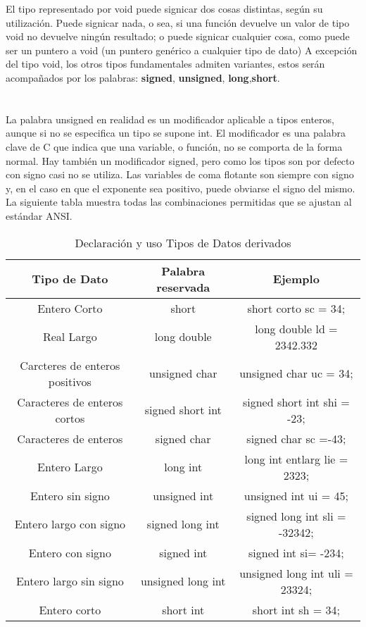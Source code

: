 \documentclass[a4paper]{article}
\begin{document}
El tipo representado por void puede signicar dos cosas distintas, según su utilización. Puede signicar nada, o sea, si una función devuelve un valor de tipo void no devuelve ningún resultado; o puede signicar cualquier cosa, como puede ser un puntero a void (un puntero genérico a cualquier tipo de dato) A excepción del tipo void, los otros tipos fundamentales admiten variantes, estos serán acompañados por los palabras: \textbf{signed}, \textbf{unsigned}, \textbf{long},\textbf{short}. \\
\\
\\
La palabra unsigned en realidad es un modificador aplicable a tipos enteros, aunque si no se especifica un tipo se supone int. El modificador es una palabra clave de C que indica que una variable, o función, no se comporta de la forma normal. Hay también un modificador signed, pero como los tipos son por defecto con signo casi no se utiliza. Las variables de coma flotante son siempre con signo y, en el caso en que el exponente sea positivo, puede obviarse el signo del mismo. La siguiente tabla muestra todas las combinaciones permitidas que se ajustan al estándar ANSI.

\begin{table}[H]
\centering
	\begin{tabular}{ c | c | c } 
Tipo de Dato & Palabra reservada & Ejemplo \\ \hline
Entero Corto & short & short corto sc = 34; \\ \hline		
Real Largo & long double & long double ld = 2342.332 \\ \hline
Carcteres de enteros  positivos & unsigned char & unsigned char uc = 34; \\ \hline
Caracteres de enteros cortos & signed short int & signed short int shi = -23; \\ \hline 
Caracteres de enteros & signed char & signed char sc =-43; \\ \hline
Entero Largo & long int &  long int entlarg lie = 2323;\\ \hline 
Entero sin signo & unsigned int & unsigned int ui = 45; \\ \hline 
Entero largo con signo & signed long int & signed long int sli = -32342; \\ \hline 
Entero con signo & signed int & signed int si= -234;  \\ \hline
Entero largo sin signo & unsigned long int & unsigned long int uli = 23324; \\ \hline 
Entero corto & short int & short int sh = 34; \\ \hline 
	\end{tabular} 
	\caption{Declaración y uso Tipos de Datos derivados}
\end{table}
\\
\end{document}
